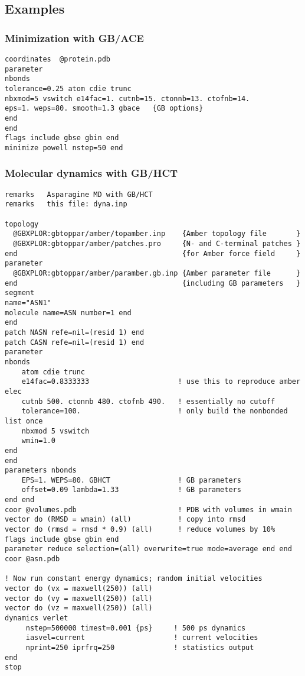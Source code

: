 \documentclass[12pt]{report}
\begin{document}
\subsection{Examples}
\subsubsection{Minimization with GB/ACE}
\begin{verbatim}
coordinates  @protein.pdb
parameter
nbonds 
tolerance=0.25 atom cdie trunc 
nbxmod=5 vswitch e14fac=1. cutnb=15. ctonnb=13. ctofnb=14.
eps=1. weps=80. smooth=1.3 gbace   {GB options}
end
end
flags include gbse gbin end
minimize powell nstep=50 end
\end{verbatim}

\subsubsection{Molecular dynamics with GB/HCT}
\begin{verbatim}
remarks   Asparagine MD with GB/HCT
remarks   this file: dyna.inp 

topology  
  @GBXPLOR:gbtoppar/amber/topamber.inp    {Amber topology file       }
  @GBXPLOR:gbtoppar/amber/patches.pro     {N- and C-terminal patches }
end                                       {for Amber force field     }
parameter 
  @GBXPLOR:gbtoppar/amber/paramber.gb.inp {Amber parameter file      }
end                                       {including GB parameters   }
segment
name="ASN1"
molecule name=ASN number=1 end
end
patch NASN refe=nil=(resid 1) end
patch CASN refe=nil=(resid 1) end
parameter 
nbonds 
    atom cdie trunc 
    e14fac=0.8333333                     ! use this to reproduce amber elec
    cutnb 500. ctonnb 480. ctofnb 490.   ! essentially no cutoff
    tolerance=100.                       ! only build the nonbonded list once
    nbxmod 5 vswitch
    wmin=1.0
end 
end
parameters nbonds
    EPS=1. WEPS=80. GBHCT                ! GB parameters
    offset=0.09 lambda=1.33              ! GB parameters
end end
coor @volumes.pdb                        ! PDB with volumes in wmain
vector do (RMSD = wmain) (all)           ! copy into rmsd
vector do (rmsd = rmsd * 0.9) (all)      ! reduce volumes by 10%
flags include gbse gbin end
parameter reduce selection=(all) overwrite=true mode=average end end
coor @asn.pdb

! Now run constant energy dynamics; random initial velocities
vector do (vx = maxwell(250)) (all)
vector do (vy = maxwell(250)) (all)
vector do (vz = maxwell(250)) (all)
dynamics verlet
     nstep=500000 timest=0.001 {ps}     ! 500 ps dynamics
     iasvel=current                     ! current velocities 
     nprint=250 iprfrq=250              ! statistics output
end 
stop
\end{verbatim}
\end{document}
